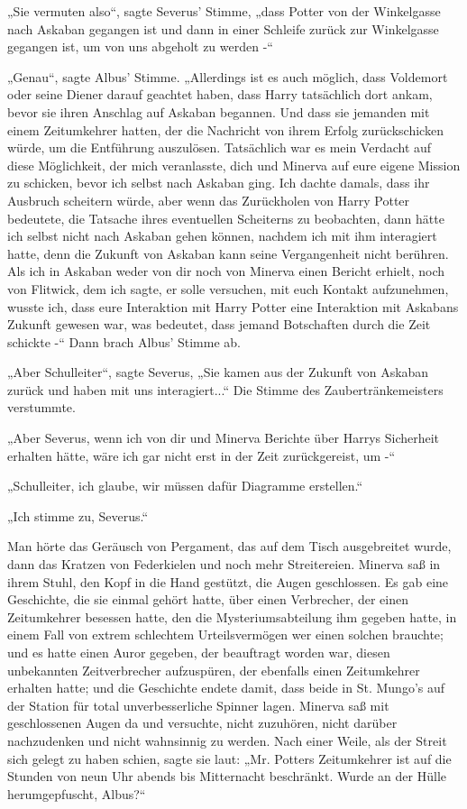 {„Sie vermuten also“, sagte Severus' Stimme, „dass Potter von der Winkelgasse nach Askaban gegangen ist und dann in einer Schleife zurück zur Winkelgasse gegangen ist, um von uns abgeholt zu werden -“

„Genau“, sagte Albus' Stimme. „Allerdings ist es auch möglich, dass Voldemort oder seine Diener darauf geachtet haben, dass Harry tatsächlich dort ankam, bevor sie ihren Anschlag auf Askaban begannen. Und dass sie jemanden mit einem Zeitumkehrer hatten, der die Nachricht von ihrem Erfolg zurückschicken würde, um die Entführung auszulösen. Tatsächlich war es mein Verdacht auf diese Möglichkeit, der mich veranlasste, dich und Minerva auf eure eigene Mission zu schicken, bevor ich selbst nach Askaban ging. Ich dachte damals, dass ihr Ausbruch scheitern würde, aber wenn das Zurückholen von Harry Potter bedeutete, die Tatsache ihres eventuellen Scheiterns zu beobachten, dann hätte ich selbst nicht nach Askaban gehen können, nachdem ich mit ihm interagiert hatte, denn die Zukunft von Askaban kann seine Vergangenheit nicht berühren. Als ich in Askaban weder von dir noch von Minerva einen Bericht erhielt, noch von Flitwick, dem ich sagte, er solle versuchen, mit euch Kontakt aufzunehmen, wusste ich, dass eure Interaktion mit Harry Potter eine Interaktion mit Askabans Zukunft gewesen war, was bedeutet, dass jemand Botschaften durch die Zeit schickte -“ Dann brach Albus' Stimme ab.

„Aber Schulleiter“, sagte Severus, „Sie kamen aus der Zukunft von Askaban zurück und haben mit uns interagiert...“ Die Stimme des Zaubertränkemeisters verstummte.

„Aber Severus, wenn ich von dir und Minerva Berichte über Harrys Sicherheit erhalten hätte, wäre ich gar nicht erst in der Zeit zurückgereist, um -“

„Schulleiter, ich glaube, wir müssen dafür Diagramme erstellen.“

„Ich stimme zu, Severus.“

Man hörte das Geräusch von Pergament, das auf dem Tisch ausgebreitet wurde, dann das Kratzen von Federkielen und noch mehr Streitereien. Minerva saß in ihrem Stuhl, den Kopf in die Hand gestützt, die Augen geschlossen. Es gab eine Geschichte, die sie einmal gehört hatte, über einen Verbrecher, der einen Zeitumkehrer besessen hatte, den die Mysteriumsabteilung ihm gegeben hatte, in einem Fall von extrem schlechtem Urteilsvermögen wer einen solchen brauchte; und es hatte einen Auror gegeben, der beauftragt worden war, diesen unbekannten Zeitverbrecher aufzuspüren, der ebenfalls einen Zeitumkehrer erhalten hatte; und die Geschichte endete damit, dass beide in St. Mungo's auf der Station für total unverbesserliche Spinner lagen. Minerva saß mit geschlossenen Augen da und versuchte, nicht zuzuhören, nicht darüber nachzudenken und nicht wahnsinnig zu werden. Nach einer Weile, als der Streit sich gelegt zu haben schien, sagte sie laut: „Mr. Potters Zeitumkehrer ist auf die Stunden von neun Uhr abends bis Mitternacht beschränkt. Wurde an der Hülle herumgepfuscht, Albus?“

}
